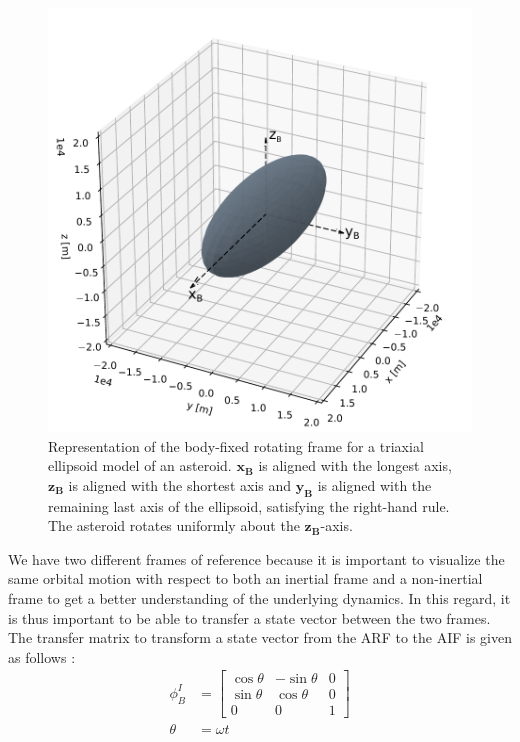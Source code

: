 \begin{figure}[htb]
\centering
\captionsetup{justification=centering}
\includegraphics[width=\textwidth, height=0.35\textheight, keepaspectratio=true]{body_fixed_ellipsoid_frame.pdf}
\caption{Representation of the body-fixed rotating frame for a triaxial ellipsoid model of an asteroid. $\bm{x_{B}}$ is aligned with the longest axis, $\bm{z_{B}}$ is aligned with the shortest axis and $\bm{y_{B}}$ is aligned with the remaining last axis of the ellipsoid, satisfying the right-hand rule. The asteroid rotates uniformly about the $\bm{z_{B}}$-axis.}
\label{fig:ellipsoid_rotating_frame}
\end{figure}
\FloatBarrier
We have two different frames of reference because it is important to visualize the same orbital motion with respect to both an inertial frame and a non-inertial frame to get a better understanding of the underlying dynamics. In this regard, it is thus important to be able to transfer a state vector between the two frames. The transfer matrix to transform a state vector from the \gls{ARF} to the \gls{AIF} is given as follows \parencite{schaub2003Book}:
\begin{equation}
    \begin{aligned}
        \phi_{B}^{I} &=
        \begin{bmatrix}
            \cos\theta & -\sin\theta & 0 \\
            \sin\theta & \cos\theta & 0 \\
            0 & 0 & 1
        \end{bmatrix}
        \\
        \theta &= \omega t
    \end{aligned}
    \label{eqn:arf_to_aif_transformation matrix}
\end{equation}
